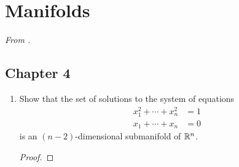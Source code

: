 \documentclass[../psets.tex]{subfiles}
\begin{document}
\section{Manifolds}
\emph{From \textcite{bib:DifferentialForms}.}
\subsection*{Chapter 4}
\begin{enumerate}[label={\textbf{4.1.\roman*.}}]
    \item {}Show that the set of solutions to the system of equations
    \begin{align*}
        x_1^2+\cdots+x_n^2 &= 1\\
        x_1+\cdots+x_n &= 0
    \end{align*}
    is an $(n-2)$-dimensional submanifold of $\mathbb{R}^n$.
    \begin{proof}
        


\end{proof}
\end{enumerate}
\end{document}

